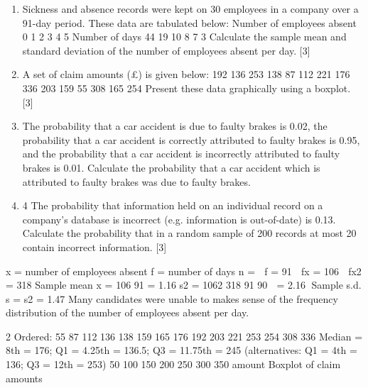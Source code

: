\documentclass[a4paper,12pt]{article}
\begin{document}
\begin{enumerate}

\item Sickness and absence records were kept on 30 employees in a company over a 91-day
period. These data are tabulated below:
Number of employees absent 0 1 2 3 4 5
Number of days 44 19 10 8 7 3
Calculate the sample mean and standard deviation of the number of employees absent
per day. [3]

\item A set of claim amounts (£) is given below:
192 136 253 138 87
112 221 176 336 203
159 55 308 165 254
Present these data graphically using a boxplot. [3]

\item  The probability that a car accident is due to faulty brakes is 0.02, the probability that a
car accident is correctly attributed to faulty brakes is 0.95, and the probability that a
car accident is incorrectly attributed to faulty brakes is 0.01.
Calculate the probability that a car accident which is attributed to faulty brakes was
due to faulty brakes. 
\item 4 The probability that information held on an individual record on a company's
database is incorrect (e.g. information is out-of-date) is 0.13.
Calculate the probability that in a random sample of 200 records at most 20 contain
incorrect information. [3]
\end{enumerate}


 x = number of employees absent
f = number of days
n =  f = 91  fx = 106  fx2 = 318
Sample mean x = 106
91
= 1.16
s2 =
1062 318
91
90

= 2.16  Sample s.d. s = s2 = 1.47
Many candidates were unable to makes sense of the frequency distribution of the number of employees
absent per day.

2 Ordered: 55 87 112 136 138 159 165 176 192 203 221 253 254 308 336
Median = 8th = 176; Q1 = 4.25th = 136.5; Q3 = 11.75th = 245
(alternatives: Q1 = 4th = 136; Q3 = 12th = 253)
50 100 150 200 250 300 350
amount
Boxplot of claim amounts
\end{document}
